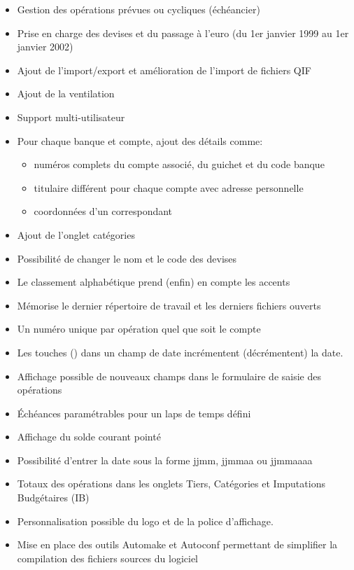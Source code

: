 \begin{itemize}
	\item Gestion des opérations prévues ou cycliques (échéancier) 
	\item Prise en charge des devises et du passage à l'euro (du 1er janvier 1999 au 1er janvier 2002)
	\item Ajout de l'import/export et amélioration de l'import de fichiers \gls{QIF}
	\item Ajout de la ventilation
	\item Support multi-utilisateur
	\item Pour chaque banque et compte, ajout des détails comme:
		\begin{itemize}
		\item numéros complets du compte associé, du guichet et du code banque
		\item titulaire différent pour chaque compte avec adresse personnelle
		\item coordonnées d'un correspondant
		\end{itemize}
	\item Ajout de l'onglet catégories
	\item Possibilité de changer le nom et le code des devises
	\item Le classement alphabétique prend (enfin) en compte les accents
	\item Mémorise le dernier répertoire de travail et les derniers fichiers ouverts
	\item Un numéro unique par opération quel que soit le compte
	\item Les touches \key{+} (\key{-}) dans un champ de date incrémentent (décrémentent)
	la date.
	\item Affichage possible de nouveaux champs dans le formulaire de saisie des opérations 
	\item Échéances paramétrables pour un laps de temps défini
	\item Affichage du solde courant pointé
	\item Possibilité d'entrer la date sous la forme jjmm, jjmmaa ou jjmmaaaa
	\item Totaux des opérations dans les onglets Tiers, Catégories et Imputations Budgétaires (IB)
	\item Personnalisation possible du logo et de la police d'affichage.
	\item Mise en place des outils Automake et Autoconf permettant de simplifier la compilation des fichiers sources du logiciel
\end{itemize}

